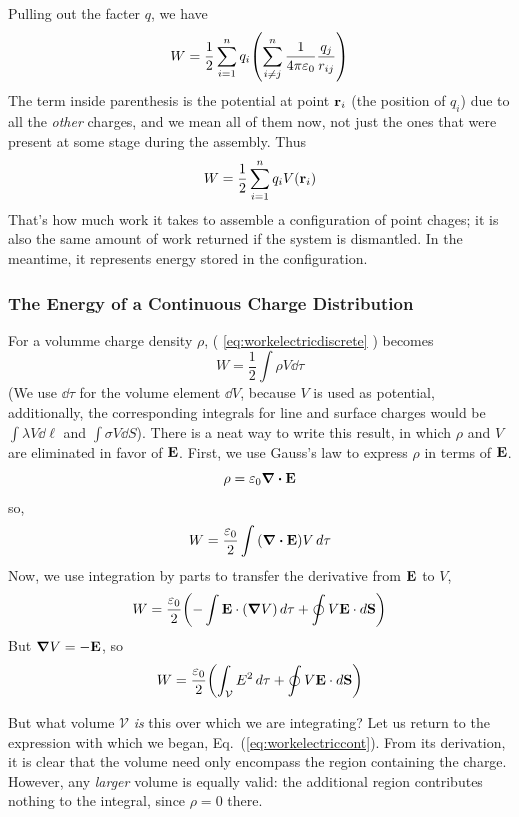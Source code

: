 		Pulling out the facter $q$, we have
		\[
			W 
			= 
			\frac{1}{2} 
			\sum_{i=1}^n
			q_i
			\pqty{
				\sum_{i\neq j}^n
				\frac{1}{4\pi\epsz} 
				\frac{q_j}{r_{ij}} 
			}
		\]
		The term inside parenthesis is the potential at point $\vb{r}_i$ (the position of
		$q_i$) due to all the \textit{other} charges, and we mean all of them now, not just the 
		ones that were present at some stage during the assembly. Thus
		\begin{equation}
			\label{eq:workelectricdiscrete}
		    W 
			= 
			\frac{1}{2} 
			\sum_{i=1}^n
			q_i
			V(\vb{r}_i)
		\end{equation}
		That's how much work it takes to assemble a configuration of point chages;
		it is also the same amount of work returned if the system is dismantled.
		In the meantime, it represents energy stored in the configuration.
	\subsubsection{The Energy of a Continuous Charge Distribution}
		For a volumme charge density $\rho$, (%
			\ref{eq:workelectricdiscrete}%
		) becomes
		\begin{equation}
			\label{eq:workelectriccont}
		    W 
			=
			\frac{1}{2}
			\int \rho V \dd{\tau}
		\end{equation}
		(We use $\dd{\tau}$ for the volume element $\dd{V}$, because $V$ is used as potential,
		additionally, the corresponding integrals for line and surface charges would be $\int\lambda V\dd{\ell}$
		and $\int \sigma V \dd{S}$). There is a neat way to write this result, in which
		$\rho$ and $V$ are eliminated in favor of $\vb E$. First, we use Gauss's law to express
		$\rho$ in terms of $\vb E$.
		\[
			\rho = \varepsilon_0 \div \vb{E}
		\]
		so,
		\[
			W = \frac{\epsz}{2}\int \pqty{\div \vb{E}}V \dd{\tau} 
		\]
		Now, we use integration by parts to transfer the derivative from $\vb{E}$ to $V$,
		\[
			W 
			= \frac{\epsz}{2}
			\pqty{
				-\int\vb{E}\cdot(\grad V)\dd{\tau} + \oint V \vb{E}\cdot\dd{\vb S}
			}
		\]
		But $\grad V = - \vb{E}$, so
		\begin{equation}
			\label{eq:WorkElectricContNeat}
			W 
			= \frac{\epsz}{2}
			\pqty{
				\int_\mathcal{V} E^2 \dd{\tau} + \oint V \vb{E}\cdot\dd{\vb S}
			}
		\end{equation}
		
		But what volume $\mathcal{V}$ \textit{is} this over which we are integrating? Let us return
		to the expression with which we began, Eq.~(\ref{eq:workelectriccont}). From
		its derivation, it is clear that the volume need only encompass the region 
		containing the charge. However, any \textit{larger} volume is equally valid: 
		the additional region contributes nothing to the integral, since $\rho=0$ there.

